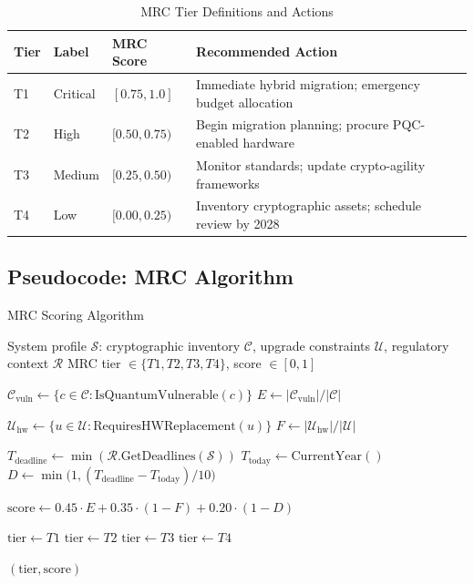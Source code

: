 \documentclass[journal]{IEEEtran}
\begin{document}
\begin{table}[t]
\caption{MRC Tier Definitions and Actions}
\label{tab:mrc_tiers}
\centering
\footnotesize
\renewcommand{\arraystretch}{1.2}
\begin{tabular}{@{}C{0.8cm}L{1.5cm}C{1.5cm}L{3.8cm}@{}}
\toprule
\textbf{Tier} & \textbf{Label} & \textbf{MRC Score} & \textbf{Recommended Action} \\
\midrule
T1 & Critical & $[0.75, 1.0]$ & Immediate hybrid migration; emergency budget allocation \\
T2 & High     & $[0.50, 0.75)$ & Begin migration planning; procure PQC-enabled hardware \\
T3 & Medium   & $[0.25, 0.50)$ & Monitor standards; update crypto-agility frameworks \\
T4 & Low      & $[0.00, 0.25)$ & Inventory cryptographic assets; schedule review by 2028 \\
\bottomrule
\end{tabular}
\end{table}

\subsection{Pseudocode: MRC Algorithm}

\begin{algorithm}[t]
\caption{MRC Scoring Algorithm}
\label{alg:mrc}
\begin{algorithmic}[1]
\REQUIRE System profile $\mathcal{S}$: cryptographic inventory $\mathcal{C}$,
  upgrade constraints $\mathcal{U}$, regulatory context $\mathcal{R}$
\ENSURE MRC tier $\in \{T1, T2, T3, T4\}$, score $\in [0,1]$

\STATE $\mathcal{C}_{\text{vuln}} \leftarrow \{c \in \mathcal{C} : \text{IsQuantumVulnerable}(c)\}$
\STATE $E \leftarrow |\mathcal{C}_{\text{vuln}}| / |\mathcal{C}|$

\STATE $\mathcal{U}_{\text{hw}} \leftarrow \{u \in \mathcal{U} : \text{RequiresHWReplacement}(u)\}$
\STATE $F \leftarrow |\mathcal{U}_{\text{hw}}| / |\mathcal{U}|$

\STATE $T_{\text{deadline}} \leftarrow \min(\mathcal{R}.\text{GetDeadlines}(\mathcal{S}))$
\STATE $T_{\text{today}} \leftarrow \text{CurrentYear}()$
\STATE $D \leftarrow \min\bigl(1, (T_{\text{deadline}} - T_{\text{today}}) / 10\bigr)$

\STATE $\text{score} \leftarrow 0.45 \cdot E + 0.35 \cdot (1 - F) + 0.20 \cdot (1 - D)$

  \STATE $\text{tier} \leftarrow T1$ 
  \STATE $\text{tier} \leftarrow T2$ 
  \STATE $\text{tier} \leftarrow T3$ 
\ELSE
  \STATE $\text{tier} \leftarrow T4$ 
\ENDIF

\RETURN $(\text{tier}, \text{score})$
\end{algorithmic}
\end{algorithm}
\end{document}
